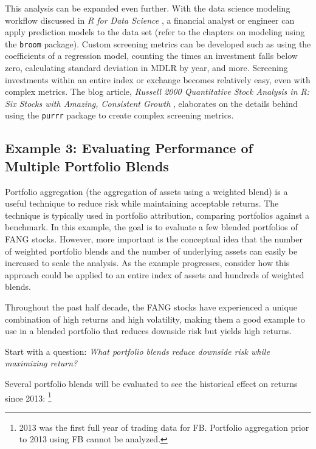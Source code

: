 \hspace{20 mm}

This analysis can be expanded even further. With the data science
modeling workflow discussed in \emph{R for Data Science}
\citep{R4DS2017}, a financial analyst or engineer can apply prediction
models to the data set (refer to the chapters on modeling using the
\texttt{broom} package). Custom screening metrics can be developed such
as using the coefficients of a regression model, counting the times an
investment falls below zero, calculating standard deviation in MDLR by
year, and more. Screening investments within an entire index or exchange
becomes relatively easy, even with complex metrics. The blog article,
\emph{Russell 2000 Quantitative Stock Analysis in R: Six Stocks with
Amazing, Consistent Growth} \citep{russell2000}, elaborates on the
details behind using the \texttt{purrr} package to create complex
screening metrics.

\subsection{Example 3: Evaluating Performance of Multiple Portfolio
Blends}\label{example-3-evaluating-performance-of-multiple-portfolio-blends}

Portfolio aggregation (the aggregation of assets using a weighted blend)
is a useful technique to reduce risk while maintaining acceptable
returns. The technique is typically used in portfolio attribution,
comparing portfolios against a benchmark. In this example, the goal is
to evaluate a few blended portfolios of FANG stocks. However, more
important is the conceptual idea that the number of weighted portfolio
blends and the number of underlying assets can easily be increased to
scale the analysis. As the example progresses, consider how this
approach could be applied to an entire index of assets and hundreds of
weighted blends.

Throughout the past half decade, the FANG stocks have experienced a
unique combination of high returns and high volatility, making them a
good example to use in a blended portfolio that reduces downside risk
but yields high returns.

Start with a question: \emph{What portfolio blends reduce downside risk
while maximizing return?}

Several portfolio blends will be evaluated to see the historical effect
on returns since 2013:
\footnote{2013 was the first full year of trading data for FB. Portfolio aggregation prior to 2013 using FB cannot be analyzed.}

